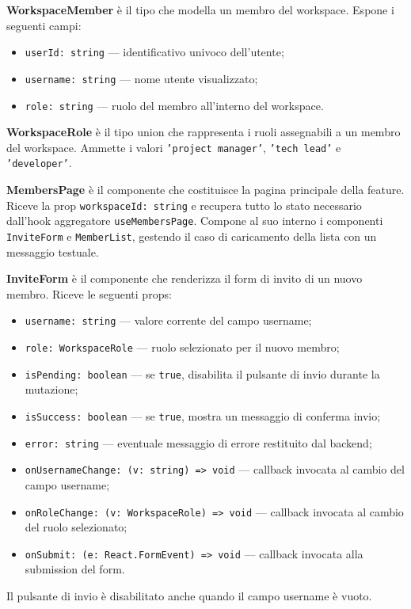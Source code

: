 \documentclass[a4paper, 11pt]{article}
\newcounter{subsubsubsection}[subsubsection]
\newcounter{subsubsubsubsection}[subsubsubsection]
\begin{document}

\textbf{WorkspaceMember} è il tipo che modella un membro del workspace. Espone i seguenti campi:
\begin{itemize}
  \item \texttt{userId: string} — identificativo univoco dell'utente;
  \item \texttt{username: string} — nome utente visualizzato;
  \item \texttt{role: string} — ruolo del membro all'interno del workspace.
\end{itemize}

\textbf{WorkspaceRole} è il tipo union che rappresenta i ruoli assegnabili a un membro del
workspace. Ammette i valori \texttt{'project manager'}, \texttt{'tech lead'} e
\texttt{'developer'}.


\textbf{MembersPage} è il componente che costituisce la pagina principale della feature. Riceve
la prop \texttt{workspaceId: string} e recupera tutto lo stato necessario dall'hook aggregatore
\texttt{useMembersPage}. Compone al suo interno i componenti \texttt{InviteForm} e
\texttt{MemberList}, gestendo il caso di caricamento della lista con un messaggio testuale.

\textbf{InviteForm} è il componente che renderizza il form di invito di un nuovo membro. Riceve
le seguenti props:
\begin{itemize}
  \item \texttt{username: string} — valore corrente del campo username;
  \item \texttt{role: WorkspaceRole} — ruolo selezionato per il nuovo membro;
  \item \texttt{isPending: boolean} — se \texttt{true}, disabilita il pulsante di invio durante
        la mutazione;
  \item \texttt{isSuccess: boolean} — se \texttt{true}, mostra un messaggio di conferma invio;
  \item \texttt{error: string} — eventuale messaggio di errore restituito dal backend;
  \item \texttt{onUsernameChange: (v: string) => void} — callback invocata al cambio del campo
        username;
  \item \texttt{onRoleChange: (v: WorkspaceRole) => void} — callback invocata al cambio del
        ruolo selezionato;
  \item \texttt{onSubmit: (e: React.FormEvent) => void} — callback invocata alla submission del
        form.
\end{itemize}
Il pulsante di invio è disabilitato anche quando il campo username è vuoto.
\end{document}
